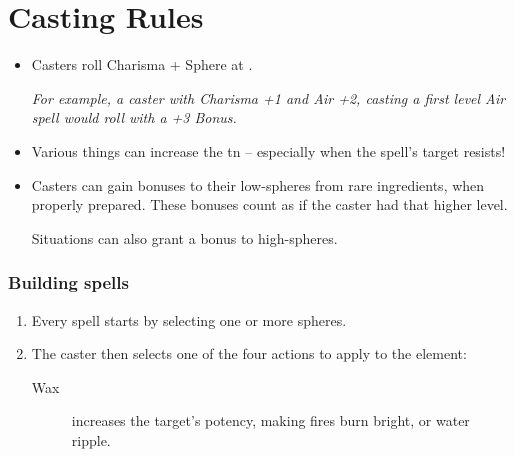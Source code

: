 
\chapter{Casting Rules}

\begin{multicols}{2}

\begin{itemize}
  \item
  Casters roll Charisma + Sphere at \tn[7].

  \textit{For example, a caster with Charisma +1 and Air +2, casting a first level Air spell would roll with a +3 Bonus.}
  \item
  Various things can increase the \gls{tn} -- especially when the spell's target resists!
  \item
  Casters can gain bonuses to their low-spheres from rare ingredients, when properly prepared.
  These bonuses count as if the caster had that higher level.

  Situations can also grant a bonus to high-spheres.
\end{itemize}

\subsection{Building spells}

\begin{enumerate}
  \item
  Every spell starts by selecting one or more spheres.
  \item
  The caster then selects one of the four actions to apply to the element:
  \begin{description}
    \item[Wax]
    increases the target's potency, making fires burn bright, or water ripple.
  \end{description}
\end{enumerate}

\end{multicols}
